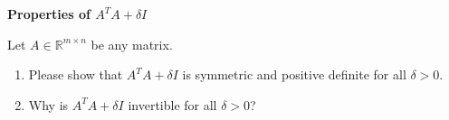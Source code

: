 \textbf{\normalsize Properties of $A^TA + \delta I$}

Let $A \in  \mathbb{R}^{m \times n}$ be any matrix.
\begin{enumerate}
	\item Please show that
	$A^TA + \delta I$ is  symmetric and positive definite for all $\delta >0$. 
	\item Why is $A^TA + \delta I$ invertible for all $\delta >0$?
\end{enumerate} 